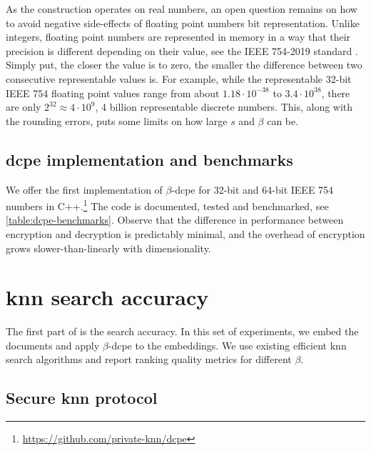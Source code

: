 			As the construction operates on real numbers, an open question remains on how to avoid negative side-effects of floating point numbers bit representation.
			Unlike integers, floating point numbers are represented in memory in a way that their precision is different depending on their value, see the IEEE 754-2019 standard \cite{ieee-floating-point}. %
			Simply put, the closer the value is to zero, the smaller the difference between two consecutive representable values is.
			For example, while the representable 32-bit IEEE 754 floating point values range from about $1.18 \cdot 10^{-38}$ to $3.4 \cdot 10^{38}$, there are only $2^{32} \approx 4 \cdot 10^9$, 4 billion representable discrete numbers.
			This, along with the rounding errors, puts some limits on how large $s$ and $\beta$ can be.

		\subsection{\texorpdfstring{\acrshort{dcpe}}{DCPE} implementation and benchmarks}

			We offer the first implementation of \cite{dcpe} $\beta$-\acrshort{dcpe} for 32-bit and 64-bit IEEE 754 numbers in C++.\footnote{
				\url{https://github.com/private-knn/dcpe}
			}
			The code is documented, tested and benchmarked, see \cref{table:dcpe-benchmarks}.
			Observe that the difference in performance between encryption and decryption is predictably minimal, and the overhead of encryption grows slower-than-linearly with dimensionality.

			

	\section{\texorpdfstring{\acrshort{knn}}{kNN} search accuracy}\label{section:knn-snapshot:search}

		The first part of \kanon{} is the search accuracy.
		In this set of experiments, we embed the documents and apply $\beta$-\acrshort{dcpe} to the embeddings.
		We use existing efficient \acrshort{knn} search algorithms and report ranking quality metrics for different $\beta$.

		\subsection{Secure \texorpdfstring{\acrshort{knn}}{kNN} protocol}

